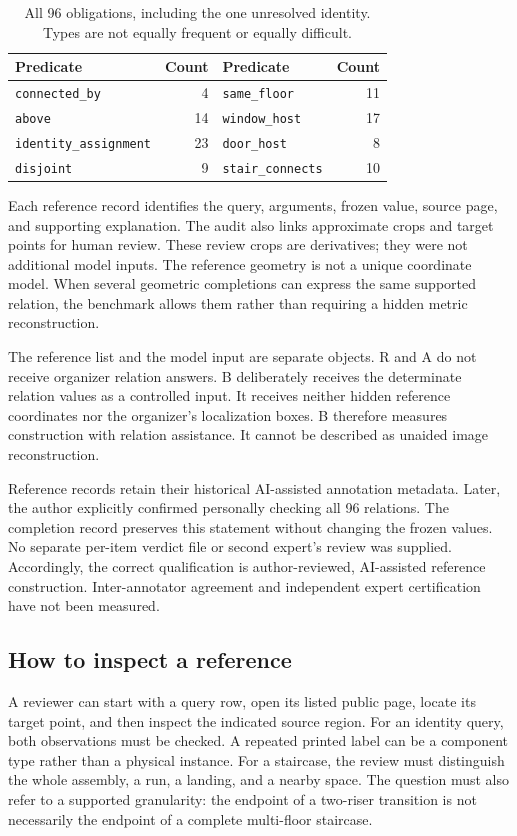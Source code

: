 \begin{table}[htbp]\centering
\begin{tabular}{lr@{\qquad}lr}\toprule
Predicate & Count & Predicate & Count\\\midrule
\texttt{connected\_by} & 4 & \texttt{same\_floor} & 11\\
\texttt{above} & 14 & \texttt{window\_host} & 17\\
\texttt{identity\_assignment} & 23 & \texttt{door\_host} & 8\\
\texttt{disjoint} & 9 & \texttt{stair\_connects} & 10\\\bottomrule
\end{tabular}
\caption{All 96 obligations, including the one unresolved identity. Types are not equally frequent or equally difficult.}\label{tab:A-predicates}
\end{table}

Each reference record identifies the query, arguments, frozen value, source page, and supporting explanation. The audit also links approximate crops and target points for human review. These review crops are derivatives; they were not additional model inputs. The reference geometry is not a unique coordinate model. When several geometric completions can express the same supported relation, the benchmark allows them rather than requiring a hidden metric reconstruction.

The reference list and the model input are separate objects. R and A do not receive organizer relation answers. B deliberately receives the determinate relation values as a controlled input. It receives neither hidden reference coordinates nor the organizer's localization boxes. B therefore measures construction with relation assistance. It cannot be described as unaided image reconstruction.

Reference records retain their historical AI-assisted annotation metadata. Later, the author explicitly confirmed personally checking all 96 relations. The completion record preserves this statement without changing the frozen values. No separate per-item verdict file or second expert's review was supplied. Accordingly, the correct qualification is author-reviewed, AI-assisted reference construction. Inter-annotator agreement and independent expert certification have not been measured.

\subsection{How to inspect a reference}
A reviewer can start with a query row, open its listed public page, locate its target point, and then inspect the indicated source region. For an identity query, both observations must be checked. A repeated printed label can be a component type rather than a physical instance. For a staircase, the review must distinguish the whole assembly, a run, a landing, and a nearby space. The question must also refer to a supported granularity: the endpoint of a two-riser transition is not necessarily the endpoint of a complete multi-floor staircase.

